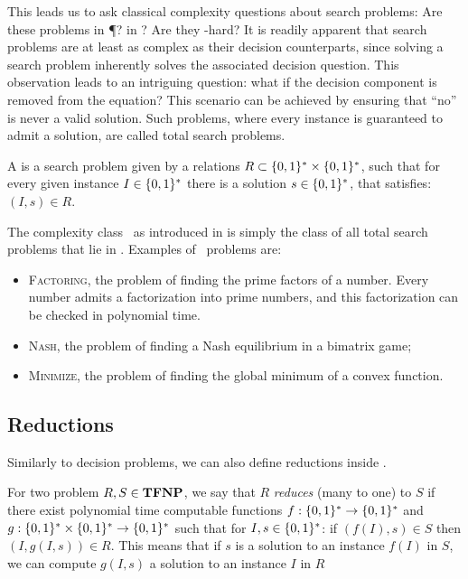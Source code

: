 This leads us to ask classical complexity questions about search problems: Are these problems in \P? in \NP? Are they \NP-hard? It is readily apparent that search problems are at least as complex as their decision counterparts, since solving a search problem inherently solves the associated decision question. This observation leads to an intriguing question: what if the decision component is removed from the equation? This scenario can be achieved by ensuring that ``no'' is never a valid solution. Such problems, where every instance is guaranteed to admit a solution, are called total search problems.

\begin{definition}
    A  is a search problem given by a relations $R\subset \{0, 1\}^* \times \{0, 1\}^*$, such that for every given instance $I\in
        \{0, 1\}^*$ there is a solution $s \in \{0, 1\}^*$, that satisfies: $(I, s) \in R$.
\end{definition}

The complexity class \TFNP\ as introduced in  is simply the class of all total search problems that lie in \NP. Examples of \TFNP\ problems are:
\begin{itemize}
    \item \textsc{Factoring}, the problem of finding the prime factors of a number. Every number admits a factorization into prime numbers, and this factorization can be checked in polynomial time.
    \item \textsc{Nash}, the problem of finding a Nash equilibrium in a bimatrix game;
    \item \textsc{Minimize}, the problem of finding the global minimum of a convex function.
\end{itemize}

\subsection{Reductions}

Similarly to decision problems, we can also define reductions inside \TFNP.

\begin{definition}
    For two problem $R, S \in \textbf{TFNP}$, we say that $R$ \emph{reduces} (many to one) to $S$ if there exist polynomial time computable functions $f : \{0, 1\}^* \rightarrow \{0, 1\}^*$ and $g : \{0, 1\}^* \times \{0, 1\}^* \rightarrow \{0, 1\}^*$ such that for $I, s \in \{0, 1\}^*$: if $(f(I), s) \in S$ then $(I, g(I, s)) \in R$. This means that if $s$ is a solution to an instance $f(I)$ in $S$, we can compute $g(I, s)$ a solution to an instance $I$ in $R$
\end{definition}

